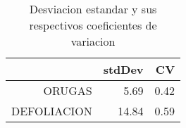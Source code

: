 \begin{table}[ht]
\centering
\begin{tabular}{rrr}
  \hline
 & stdDev & CV \\ 
  \hline
ORUGAS & 5.69 & 0.42 \\ 
  DEFOLIACION & 14.84 & 0.59 \\ 
   \hline
\end{tabular}
\caption{Desviacion estandar y sus
               respectivos coeficientes de variacion} 
\label{table:stdDevs}
\end{table}
